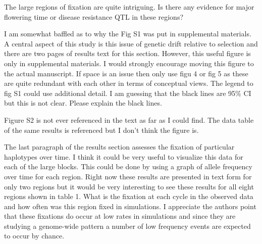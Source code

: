 \documentclass[onecolumn,oneside,letterpaper]{article}
\begin{document}
The large regions of fixation are quite intriguing.  Is there any evidence for major flowering time or disease resistance QTL in these regions?


I am somewhat baffled as to why the Fig S1 was put in supplemental materials.  A central aspect of this study is this issue of genetic drift relative to selection and there are two pages of results text for this section.  However, this useful figure is only in supplemental materials.  I would strongly encourage moving this figure to the actual manuscript.  If space is an issue then only use figu 4 or fig 5 as these are quite redundant with each other in terms of conceptual views. 
The legend to fig S1 could use additional detail.  I am guessing that the black lines are 95\% CI but this is not clear.  Please explain the black lines.


Figure S2 is not ever referenced in the text as far as I could find.  The data 
table of the same results is referenced but I don’t think the figure is.  


The last paragraph of the results section assesses the fixation of particular haplotypes over time.  I think it could be very useful to visualize this data for each of the large blocks.  This could be done by using a graph of allele frequency over time for each region.  Right now these results are presented in text form for only two regions but it would be very interesting to see these results for all eight regions shown in table 1.  What is the fixation at each cycle in the observed data and how often was this region fixed in simulations.  I appreciate the authors point that these fixations do occur at low rates in 
simulations and since they are studying a genome-wide pattern a number of low frequency events are expected to occur by chance.
\end{document}
